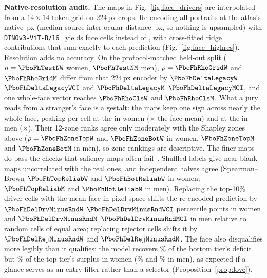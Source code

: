 \textbf{Native-resolution audit.} The maps in Fig.~\ref{fig:face_drivers} are interpolated from a $14\times 14$ token grid on $224$\,px crops. Re-encoding all \PboFhN{} portraits at the atlas's native \PboFhAtlas{}\,px (median source inter-ocular distance \PboFhIod{}\,px, so nothing is upsampled) with \texttt{DINOv3-ViT-B/16}~\cite{simeoni2025} yields \PboFhCells{} face cells instead of \PboFhLegacyCells{}, with cross-fitted ridge contributions that sum exactly to each prediction (Fig.~\ref{fig:face_highres}). Resolution adds no accuracy. On the protocol-matched held-out split ($n=\PboFhTestNW$ women, $\PboFhTestNM$ men), $\rho=\PboFhRhoGridW$ and $\PboFhRhoGridM$ differ from that $224$\,px encoder by $\PboFhDeltaLegacyW$ $\PboFhDeltaLegacyWCI$ and $\PboFhDeltaLegacyM$ $\PboFhDeltaLegacyMCI$, and one whole-face vector reaches $\PboFhRhoClsW$ and $\PboFhRhoClsM$. What a jury reads from a stranger's face is a gestalt: the maps keep one sign across nearly the whole face, peaking per cell at the \PboFhTopDenseZoneW{} in women (\PboFhTopDenseRatioW$\times$ the face mean) and at the \PboFhTopDenseZoneM{} in men (\PboFhTopDenseRatioM$\times$). Their 12-zone ranks agree only moderately with the Shapley zones above ($\rho=\PboFhZoneTopW$ and $\PboFhZoneBotW$ in women, $\PboFhZoneTopM$ and $\PboFhZoneBotM$ in men), so zone rankings are descriptive. The finer maps do pass the checks that saliency maps often fail~\cite{adebayo2018}. Shuffled labels give near-blank maps uncorrelated with the real ones, and independent halves agree (Spearman--Brown $\PboFhTopReliabW$ and $\PboFhBotReliabW$ in women; $\PboFhTopReliabM$ and $\PboFhBotReliabM$ in men). Replacing the top-10\% driver cells with the mean face in pixel space shifts the re-encoded prediction by $\PboFhDelDrvMinusRndW$ $\PboFhDelDrvMinusRndWCI$ percentile points in women and $\PboFhDelDrvMinusRndM$ $\PboFhDelDrvMinusRndMCI$ in men relative to random cells of equal area; replacing rejector cells shifts it by $\PboFhDelRejMinusRndW$ and $\PboFhDelRejMinusRndM$. The face also disqualifies more legibly than it qualifies: the model recovers \PboFhBotRecoveredW\% of the bottom tier's deficit but \PboFhTopRecoveredW\% of the top tier's surplus in women (\PboFhBotRecoveredM\% and \PboFhTopRecoveredM\% in men), as expected if a glance serves as an entry filter rather than a selector (Proposition~\ref{prop:love}).

